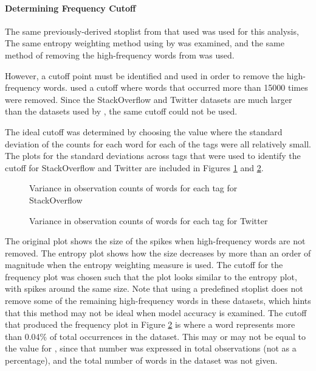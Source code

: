 \documentclass[man,floatsintext,donotrepeattitle]{apa6}
\begin{document}
\paragraph{Determining Frequency Cutoff}

The same previously-derived stoplist from \textcite{Salton2014} that \textcite{Sahlgren2008} used was used for this analysis,
The same entropy weighting method using by \textcite{Stanley2013} was examined,
and the same method of removing the high-frequency words from \citeauthor{Sahlgren2008} was used.

However, a cutoff point must be identified and used in order to remove the high-frequency words.
\textcite{Sahlgren2008} used a cutoff where words that occurred more than \num{15000} times were removed.
Since the StackOverflow and Twitter datasets are much larger than the datasets used by \citeauthor{Sahlgren2008}, the same cutoff could not be used.

The ideal cutoff was determined by choosing the value where the standard deviation of the counts for each word for each of the tags were all relatively small.
The plots for the standard deviations across tags that were used to identify the cutoff for StackOverflow and Twitter are included in Figures \ref{figContextCutoffSO} and \ref{figContextCutoffT}.

\begin{figure}[!htbp]
  \caption{Variance in observation counts of words for each tag for StackOverflow}
  \label{figContextCutoffSO}
\end{figure}

\begin{figure}[!htbp]
  \caption{Variance in observation counts of words for each tag for Twitter}
  \label{figContextCutoffT}
\end{figure}

The original plot shows the size of the spikes when high-frequency words are not removed.
The entropy plot shows how the size decreases by more than an order of magnitude when the entropy weighting measure is used.
The cutoff for the frequency plot was chosen such that the plot looks similar to the entropy plot, with spikes around the same size.
Note that using a predefined stoplist does not remove some of the remaining high-frequency words in these datasets, which hints that this method may not be ideal when model accuracy is examined.
The cutoff that produced the frequency plot in Figure \ref{figContextCutoffT} is where a word represents more than \num{.04}\% of total occurrences in the dataset.
This may or may not be equal to the value for \textcite{Sahlgren2008}, since that number was expressed in total observations (not as a percentage), and the total number of words in the dataset was not given.
\end{document}
